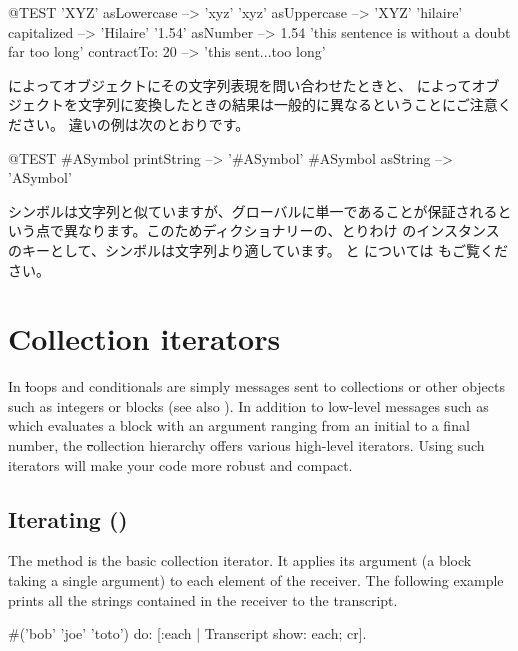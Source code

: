 \documentclass[a4paper,10pt,twoside]{book}
\begin{document}
\begin{code}{@TEST}
'XYZ' asLowercase --> 'xyz'
'xyz' asUppercase   --> 'XYZ'
'hilaire' capitalized   --> 'Hilaire'
'1.54' asNumber      --> 1.54
'this sentence is without a doubt far too long' contractTo: 20 --> 'this sent...too long'
\end{code}

 によってオブジェクトにその文字列表現を問い合わせたときと、 によってオブジェクトを文字列に変換したときの結果は一般的に異なるということにご注意ください。
違いの例は次のとおりです。

\begin{code}{@TEST}
#ASymbol printString --> '#ASymbol'
#ASymbol asString    --> 'ASymbol'
\end{code}

シンボルは文字列と似ていますが、グローバルに単一であることが保証されるという点で異なります。このためディクショナリーの、とりわけ  のインスタンスのキーとして、シンボルは文字列より適しています。
 と  については  もご覧ください。

\section{Collection iterators}

In \st loops and conditionals are simply messages sent to collections or other objects such as integers or blocks (see also ). In addition to low-level messages such as  which evaluates a block with an argument ranging from an initial to a final number, the \st collection hierarchy offers various high-level iterators. Using such iterators will make your code more robust and compact. 

\subsection{Iterating ()}
The method  is the basic collection iterator. It applies its argument (a block taking a single argument) to each element of the receiver.
The following example prints all the strings contained in the receiver to the transcript.

\begin{code}{}
#('bob' 'joe' 'toto') do: [:each | Transcript show: each; cr].
\end{code}
\end{document}
